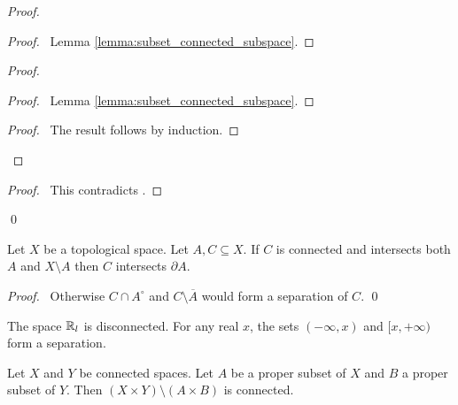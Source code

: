 \begin{proof}
    \pf
    \begin{proof}
        \pf\ Lemma \ref{lemma:subset_connected_subspace}.
    \end{proof}
    \begin{proof}
        \pf
        \begin{proof}
            \pf\ Lemma \ref{lemma:subset_connected_subspace}.
        \end{proof}
        \qedstep
        \begin{proof}
            \pf\ The result follows by induction.
        \end{proof}
    \end{proof}
    \qedstep
    \begin{proof}
        \pf\ This contradicts .
    \end{proof}
    \qed
\end{proof}

\begin{proposition}
    Let $X$ be a topological space. Let $A, C \subseteq X$. If $C$ is connected and intersects both $A$ and $X \setminus A$ then $C$ intersects $\partial A$.
\end{proposition}

\begin{proof}
    \pf\ Otherwise $C \cap A^\circ$ and $C \setminus \overline{A}$ would form a separation of $C$. \qed
\end{proof}

\begin{example}
    The space $\mathbb{R}_l$ is disconnected. For any real $x$, the sets $(- \infty, x)$ and $[x, +\infty)$ form a separation.
\end{example}

\begin{proposition}
    Let $X$ and $Y$ be connected spaces. Let $A$ be a proper subset of $X$ and $B$ a proper subset of $Y$. Then $(X \times Y) \setminus (A \times B)$ is connected.
\end{proposition}

